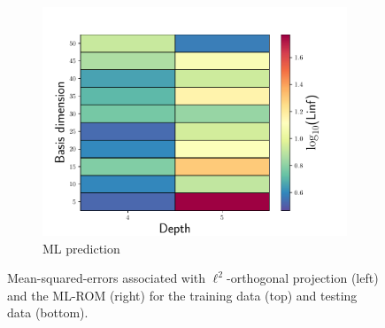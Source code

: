 \documentclass[3p,computermodern,10pt]{elsarticle}
\begin{document}
\begin{figure}
\begin{center}
\begin{subfigure}[t]{0.32\textwidth}
\includegraphics[trim={0cm 0cm 0cm 0cm},clip,width=1.0\linewidth]{code/burgers/synapse_models/basis_study/results_hyperreduction/Linf_ML.pdf}
\caption{ML prediction}
\label{fig:burg_rom_results9}
\end{subfigure}

\caption{Mean-squared-errors associated with $\ell^2$-orthogonal projection (left) and the ML-ROM (right) for the training data (top) and testing data (bottom).}
\label{fig:burg_rom_results}
\end{center}
\end{figure}
\end{document}

